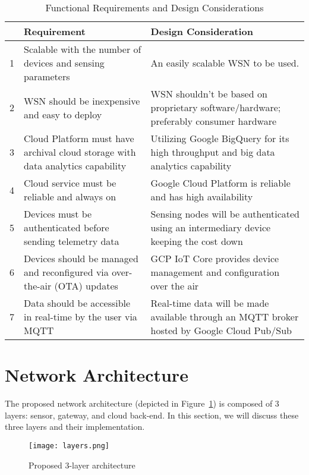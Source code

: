 \renewcommand{\arraystretch}{1.2}
\begin{table}[ht]
\centering
\begin{tabular}{ p{0.4cm} p{5cm} p{6cm}}
  \hline
  & \textbf{Requirement} & \textbf{Design Consideration}\\
  \hline
  1 & Scalable with the number of devices and sensing parameters & An easily scalable WSN to be used.\\
  2 & WSN should be inexpensive and easy to deploy & WSN shouldn't be based on proprietary software/hardware; preferably consumer hardware\\
  3 & Cloud Platform must have archival cloud storage with data analytics capability & Utilizing Google BigQuery for its high throughput and big data analytics capability\\
  4 & Cloud service must be reliable and always on & Google Cloud Platform is reliable and has high availability\\
  5 & Devices must be authenticated before sending telemetry data & Sensing nodes will be authenticated using an intermediary device keeping the cost down\\
  6 & Devices should be managed and reconfigured via over-the-air (OTA) updates & GCP IoT Core provides device management and configuration over the air\\
  7 & Data should be accessible in real-time by the user via MQTT & Real-time data will be made available through an MQTT broker hosted by Google Cloud Pub/Sub\\
  \hline
\end{tabular}
\caption{Functional Requirements and Design Considerations} 
\label{table:designConsideration}
\end{table} 

\newpage
\section{Network Architecture}

The proposed network architecture (depicted in Figure~\ref{fig:layers}) is composed of 3 layers: sensor, gateway, and cloud back-end. In this section, we will discuss these three layers and their implementation.

\begin{figure}[!h]
  \texttt{[image: layers.png]}
  \caption{Proposed 3-layer architecture}
  \label{fig:layers}
\end{figure}

